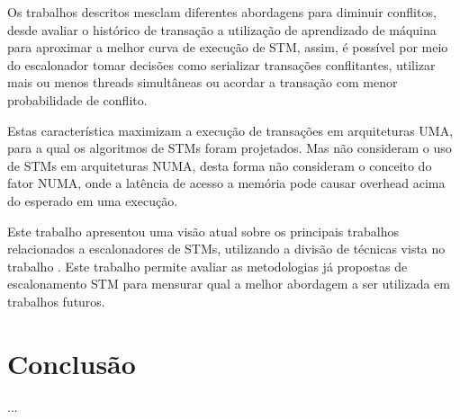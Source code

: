 \documentclass[ti]{texufpel} %
\begin{document}
Os trabalhos descritos mesclam diferentes abordagens para diminuir conflitos, desde avaliar o histórico de transação a utilização de aprendizado de máquina para aproximar a melhor curva de execução de STM, assim, é possível por meio do escalonador tomar decisões como serializar transações conflitantes, utilizar mais ou menos threads simultâneas ou acordar a transação com menor probabilidade de conflito.

Estas característica maximizam a execução de transações em arquiteturas UMA, para a qual os algoritmos de STMs foram projetados. Mas não consideram o uso de STMs em arquiteturas NUMA, desta forma não consideram o conceito do fator NUMA, onde a latência de acesso a memória pode causar overhead acima do esperado em uma execução.

Este trabalho apresentou uma visão atual sobre os principais trabalhos relacionados a escalonadores de STMs, utilizando a divisão de técnicas vista no trabalho \cite{sanzo17}. Este trabalho permite avaliar as metodologias já propostas de escalonamento STM para mensurar qual a melhor abordagem a ser utilizada em trabalhos futuros.

\chapter{Conclusão}

  ...



\end{document}

